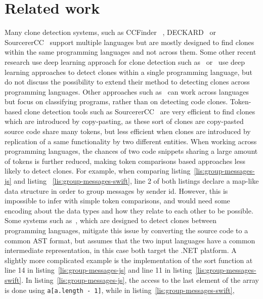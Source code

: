 \section{\label{sec:related-work}Related work}
Many clone detection systems, such as CCFinder~%
\cite{Kamiya:2002:CMT:636188.636191}, DECKARD~%
\cite{Jiang:2007:DSA:1248820.1248843} or SourcererCC~%
\cite{Sajnani:2016:SSC:2884781.2884877} support multiple languages but are
mostly designed to find clones within the same programming languages and not
across them. Some other recent research use
deep learning approach for clone detection such
as~\cite{ijcai2017-423}
or~\cite{DBLP:journals/corr/abs-1710-06159} use deep learning approaches to
detect clones within a single programming language, but do not discuss the
possibility to extend their method to detecting clones across programming
languages. Other approaches such as~\cite{White:2016:DLC:2970276.2970326} can
work across languages but focus on classifying programs, rather than on
detecting code clones.
Token-based clone detection tools such as
SourcererCC~\cite{Sajnani:2016:SSC:2884781.2884877} are very efficient
to find clones which are introduced by copy-pasting, as these sort of clones
are copy-pasted source code share many tokens, but less efficient when clones
are introduced by replication of a same functionality by two different entities.
When working across programming languages, the chances of two code snippets
sharing a large amount of tokens is further reduced, making token comparisons
based approaches less likely to detect clones.
For example, when comparing listing~\ref{lis:group-messages-js} and listing
~\ref{lis:group-messages-swift}, line 2 of both listings declare a map-like
data structure in order to group messages by sender id. However, this is
impossible to infer with simple token comparisons, and would need some encoding
about the data types and how they relate to each other to be possible. Some
systems such as~\cite{kraft2008cross}, which are designed to detect clones
between programming languages, mitigate this issue by converting the
source code to a common AST format, but assumes that the two input languages
have a common intermediate representation, in this case both target the .NET
platform.
A slightly more complicated example is the implementation of the sort function
at line 14 in listing~\ref{lis:group-messages-js} and line 11 in
listing~\ref{lis:group-messages-swift}. In listing~\ref{lis:group-messages-js},
the access to the last element of the array is done using
\lstinline{a[a.length - 1]}, while in listing~\ref{lis:group-messages-swift},
